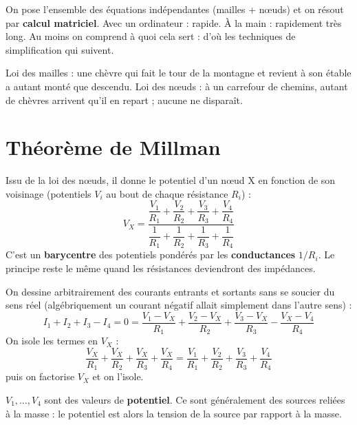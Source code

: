 \begin{rembox}[title=Constat]
On pose l'ensemble des équations indépendantes (mailles + n\oe uds) et on résout par
\textbf{calcul matriciel}. Avec un ordinateur : rapide. À la main : rapidement très long.
\og Au moins on comprend à quoi cela sert\fg{} : d'où les techniques de simplification qui
suivent.
\end{rembox}

\begin{goatbox}
Loi des mailles : une chèvre qui fait le tour de la montagne et revient à son étable a
autant monté que descendu. Loi des n\oe uds : à un carrefour de chemins, autant de chèvres
arrivent qu'il en repart ; aucune ne disparaît.
\end{goatbox}

\section{Théorème de Millman}


\begin{thmbox}[title=Théorème de Millman]
Issu de la loi des n\oe uds, il donne le potentiel d'un n\oe ud X en fonction de son
voisinage (potentiels $V_i$ au bout de chaque résistance $R_i$) :
\[ V_X = \frac{\dfrac{V_1}{R_1} + \dfrac{V_2}{R_2} + \dfrac{V_3}{R_3} + \dfrac{V_4}{R_4}}
              {\dfrac1{R_1} + \dfrac1{R_2} + \dfrac1{R_3} + \dfrac1{R_4}} \]
C'est un \textbf{barycentre} des potentiels pondérés par les \textbf{conductances} $1/R_i$.
Le principe reste le même quand les résistances deviendront des impédances.
\end{thmbox}

\begin{proofbox}[title=Démonstration]
On dessine arbitrairement des courants entrants et sortants sans se soucier du sens réel
(algébriquement un courant négatif allait simplement dans l'autre sens) :
\[ I_1 + I_2 + I_3 - I_4 = 0 = \frac{V_1-V_X}{R_1} + \frac{V_2-V_X}{R_2}
   + \frac{V_3-V_X}{R_3} - \frac{V_X-V_4}{R_4} \]
On isole les termes en $V_X$ :
\[ \frac{V_X}{R_1}+\frac{V_X}{R_2}+\frac{V_X}{R_3}+\frac{V_X}{R_4}
   = \frac{V_1}{R_1}+\frac{V_2}{R_2}+\frac{V_3}{R_3}+\frac{V_4}{R_4} \]
puis on factorise $V_X$ et on l'isole.
\end{proofbox}

\begin{warnbox}[title={Les $V_i$ sont des potentiels, pas des sources}]
$V_1,\ldots,V_4$ sont des valeurs de \textbf{potentiel}. Ce sont généralement des sources
reliées à la masse : le potentiel est alors la tension de la source par rapport à la masse.
\end{warnbox}

